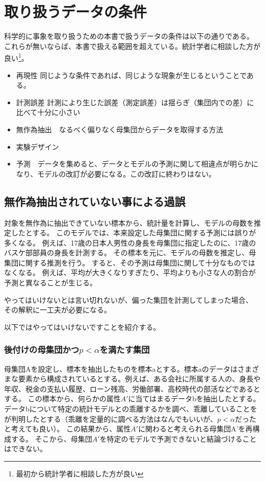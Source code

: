 \chapter{取り扱うデータの条件}
科学的に事象を取り扱うための本書で扱うデータの条件は以下の通りである。
これらが無いならば、本書で扱える範囲を超えている。統計学者に相談した方が良い\footnote{最初から統計学者に相談した方が良い}。

\begin{itemize}
    \item 再現性 同じような条件であれば、同じような現象が生じるということである。
    \item 計測誤差  計測により生じた誤差（測定誤差）は揺らぎ（集団内での差）に比べて十分に小さい
    \item 無作為抽出　なるべく偏りなく母集団からデータを取得する方法%
    \item 実験デザイン 
    \item 予測　データを集めると、データとモデルの予測に関して相違点が明らかになり、モデルの改訂が必要になる。この改訂に終わりはない。
\end{itemize}


\section{無作為抽出されていない事による過誤}
対象を無作為に抽出できていない標本から、統計量を計算し、モデルの母数を推定したとする。
このモデルでは、本来設定した母集団に関する予測には誤りが多くなる。
例えば、17歳の日本人男性の身長を母集団に指定したのに、17歳のバスケ部部員の身長を計測する。
その標本を元に、モデルの母数を推定し、母集団に関する推測を行う。
すると、その予測は母集団に関して十分なものではなくなる。
例えば、平均が大きくなりすぎたり、平均よりも小さな人の割合が予測と異なることが生じる。

やってはいけないとは言い切れないが、偏った集団を計測してしまった場合、
その解釈に一工夫が必要になる。

以下ではやってはいけないですことを紹介する。

\subsection{後付けの母集団かつ$p<\alpha$を満たす集団}
母集団Aを設定し、標本を抽出したものを標本aとする。標本aのデータはさまざまな要素から構成されているとする。例えば、ある会社に所属する人の、身長や年収、税金の支払い履歴、ローン残高、労働部署、高校時代の部活などであるとする。
この標本から、何らかの属性$A'$に当てはまるデータbを抽出したとする。
データbについて特定の統計モデルとの乖離するかを調べ、乖離していることをが判明したとする（乖離を定量的に調べる方法はなんでもいいが、$p<\alpha$だったと考えても良い）。
この結果から、属性$A'$に関わると考えられる母集団A'を再構成する。
そこから、母集団$A'$を特定のモデルで予測できないと結論づけることはできない。

